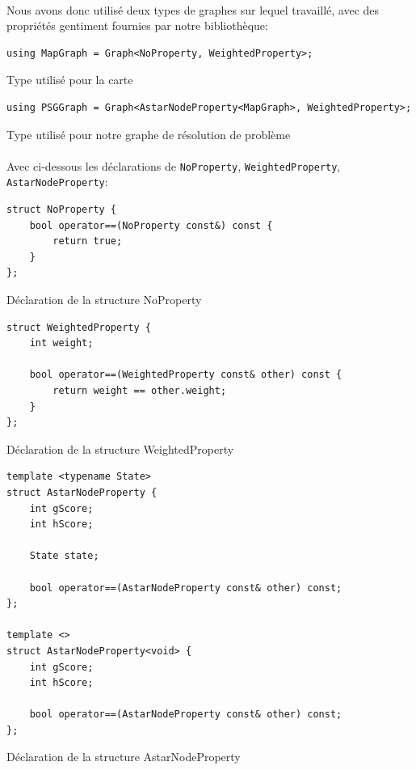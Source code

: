 \documentclass[french]{article}
\begin{document}
\paragraph{} Nous avons donc utilisé deux types de graphes sur lequel
travaillé, avec des propriétés gentiment fournies par notre bibliothèque:

\begin{listing}[H]
\begin{verbatim}
using MapGraph = Graph<NoProperty, WeightedProperty>;
\end{verbatim}
\caption{Type utilisé pour la carte}
\label{tsp:map}
\end{listing}

\begin{listing}[H]
\begin{verbatim}
using PSGGraph = Graph<AstarNodeProperty<MapGraph>, WeightedProperty>;
\end{verbatim}
\caption{Type utilisé pour notre graphe de résolution de problème}
\label{tsp:psg}
\end{listing}

\paragraph{} Avec ci-dessous les déclarations de \texttt{NoProperty},
\texttt{WeightedProperty}, \texttt{AstarNodeProperty}:

\begin{listing}[H]
\begin{verbatim}
struct NoProperty {
	bool operator==(NoProperty const&) const {
		return true;
	}
};
\end{verbatim}
\caption{Déclaration de la structure NoProperty}
\label{tsp:noprop}
\end{listing}

\begin{listing}[H]
\begin{verbatim}
struct WeightedProperty {
	int weight;

	bool operator==(WeightedProperty const& other) const {
		return weight == other.weight;
	}
};
\end{verbatim}
\caption{Déclaration de la structure WeightedProperty}
\label{tsp:weightedprop}
\end{listing}

\begin{listing}[H]
\begin{verbatim}
template <typename State>
struct AstarNodeProperty {
	int gScore;
	int hScore;

	State state;

	bool operator==(AstarNodeProperty const& other) const;
};

template <>
struct AstarNodeProperty<void> {
	int gScore;
	int hScore;

	bool operator==(AstarNodeProperty const& other) const;
};
\end{verbatim}
\caption{Déclaration de la structure AstarNodeProperty}
\label{tsp:astarnodeprop}
\end{listing}
\end{document}
